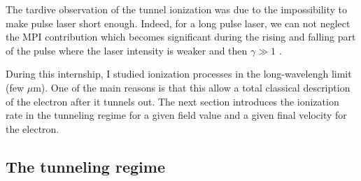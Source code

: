 \documentclass[a4paper]{article}
\begin{document}
The tardive observation of the tunnel ionization was due to the impossibility to make pulse laser short enough. Indeed, for a long pulse laser, we can not neglect the MPI contribution which becomes significant during the rising and falling part of the pulse where the laser intensity is weaker and then $\gamma \gg 1$ \cite{Chin_2004}.
\par 
During this internship, I studied ionization processes in the long-wavelengh limit (few $\mu$m). One of the main reasons is that this allow a total classical description of the electron after it tunnels out. The next section introduces the ionization rate in the tunneling regime for a given field value and a given final velocity for the electron.

\subsection{The tunneling regime}
\label{tunneling_regime}
\end{document}
